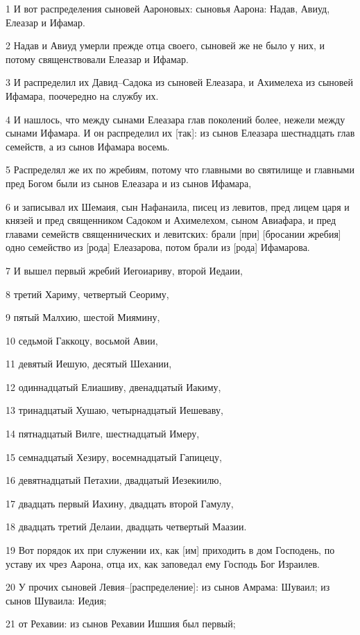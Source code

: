 \par 1 И вот распределения сыновей Аароновых: сыновья Аарона: Надав, Авиуд, Елеазар и Ифамар.
\par 2 Надав и Авиуд умерли прежде отца своего, сыновей же не было у них, и потому священствовали Елеазар и Ифамар.
\par 3 И распределил их Давид--Садока из сыновей Елеазара, и Ахимелеха из сыновей Ифамара, поочередно на службу их.
\par 4 И нашлось, что между сынами Елеазара глав поколений более, нежели между сынами Ифамара. И он распределил их [так]: из сынов Елеазара шестнадцать глав семейств, а из сынов Ифамара восемь.
\par 5 Распределял же их по жребиям, потому что главными во святилище и главными пред Богом были из сынов Елеазара и из сынов Ифамара,
\par 6 и записывал их Шемаия, сын Нафанаила, писец из левитов, пред лицем царя и князей и пред священником Садоком и Ахимелехом, сыном Авиафара, и пред главами семейств священнических и левитских: брали [при] [бросании жребия] одно семейство из [рода] Елеазарова, потом брали из [рода] Ифамарова.
\par 7 И вышел первый жребий Иегоиариву, второй Иедаии,
\par 8 третий Хариму, четвертый Сеориму,
\par 9 пятый Малхию, шестой Миямину,
\par 10 седьмой Гаккоцу, восьмой Авии,
\par 11 девятый Иешую, десятый Шехании,
\par 12 одиннадцатый Елиашиву, двенадцатый Иакиму,
\par 13 тринадцатый Хушаю, четырнадцатый Иешеваву,
\par 14 пятнадцатый Вилге, шестнадцатый Имеру,
\par 15 семнадцатый Хезиру, восемнадцатый Гапицецу,
\par 16 девятнадцатый Петахии, двадцатый Иезекиилю,
\par 17 двадцать первый Иахину, двадцать второй Гамулу,
\par 18 двадцать третий Делаии, двадцать четвертый Маазии.
\par 19 Вот порядок их при служении их, как [им] приходить в дом Господень, по уставу их чрез Аарона, отца их, как заповедал ему Господь Бог Израилев.
\par 20 У прочих сыновей Левия--[распределение]: из сынов Амрама: Шуваил; из сынов Шуваила: Иедия;
\par 21 от Рехавии: из сынов Рехавии Ишшия был первый;

